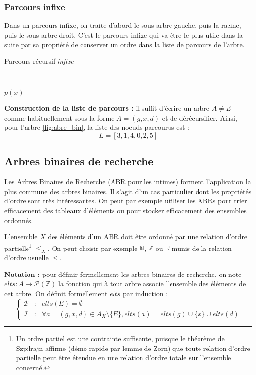 \documentclass[../../../main.tex]{subfiles}
\begin{document}
\subsubsection{Parcours infixe}
Dans un parcours infixe, on traite d'abord le sous-arbre gauche, puis la racine, puis le sous-arbre droit. C'est le parcours infixe qui va être le plus utile dans la suite par sa propriété de conserver un ordre dans la liste de parcours de l'arbre.

\begin{algorithm}
\caption{Parcours récursif \textit{infixe}\label{alg:arbre_parcours_infixe}}
\Indm\nonl{} \\
\Indp
{} {
	 {
		
	}
	 {
		\;
		$p(x)$\;
		\;
	}
}
\end{algorithm}

\textbf{Construction de la liste de parcours :} il suffit d'écrire un arbre $A\neq E$ comme habituellement sous la forme $A = (g, x, d)$ et de dérécursifier.
Ainsi, pour l'arbre \ref{fig:abre_bin}, la liste des noeuds parcourus est :
$$L = [3, 1, 4, 0, 2, 5]$$
\subsection{Arbres binaires de recherche}
\label{sub:arbres_binaires_de_recherche}
Les \underline{A}rbres \underline{B}inaires de \underline{R}echerche (ABR pour les intimes) forment l'application la plus commune des arbres binaires. Il s'agit d'un cas particulier dont les propriétés d'ordre sont très intéressantes. On peut par exemple utiliser les ABRs pour trier efficacement des tableaux d'éléments ou pour stocker efficacement des ensembles ordonnés.

L'ensemble $X$ des éléments d'un ABR doit être ordonné par une relation d'ordre partielle\footnote{Un ordre partiel est une contrainte suffisante, puisque le théorème de Szpilrajn affirme (démo rapide par lemme de Zorn) que toute relation d'ordre partielle peut être étendue en une relation d'ordre totale sur l'ensemble concerné.} $\leq_X$. On peut choisir par exemple $\mathbb{N}$, $\mathbb{Z}$ ou $\mathbb{R}$ munis de la relation d'ordre usuelle $\leq$.

\textbf{Notation :} pour définir formellement les arbres binaires de recherche, on note $elts:A\rightarrow \mathcal{P}(\mathbb{Z})$ la fonction qui à tout arbre associe l'ensemble des éléments de cet arbre.\newline
On définit formellement $elts$ par induction :
$$\left\{\begin{array}{cll}
	\mathcal{B} & : & elts(E) = \emptyset \\
	\mathcal{I} & : & \forall{a = (g, x, d)\in{A_{X}}\setminus{\{E\}}}, elts(a) = elts(g)\cup \{x\}\cup elts(d)
\end{array}\right.$$
\end{document}
